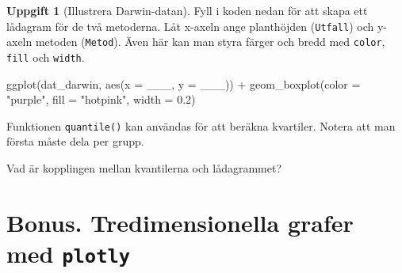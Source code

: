 \documentclass[
]{book}
\newenvironment{Shaded}{\begin{snugshade}}{\end{snugshade}}
\newcommand{\AttributeTok}[1]{\textcolor[rgb]{0.77,0.63,0.00}{#1}}
\newcommand{\FloatTok}[1]{\textcolor[rgb]{0.00,0.00,0.81}{#1}}
\newcommand{\FunctionTok}[1]{\textcolor[rgb]{0.00,0.00,0.00}{#1}}
\newcommand{\NormalTok}[1]{#1}
\newcommand{\OtherTok}[1]{\textcolor[rgb]{0.56,0.35,0.01}{#1}}
\newcommand{\SpecialCharTok}[1]{\textcolor[rgb]{0.00,0.00,0.00}{#1}}
\newcommand{\StringTok}[1]{\textcolor[rgb]{0.31,0.60,0.02}{#1}}
\theoremstyle{definition}
\theoremstyle{definition}
\theoremstyle{definition}
\newtheorem{exercise}{Uppgift}[chapter]
\theoremstyle{definition}
\theoremstyle{remark}
\begin{document}
\begin{exercise}[Illustrera Darwin-datan]
Fyll i koden nedan för att skapa ett lådagram för de två metoderna. Låt x-axeln ange planthöjden (\texttt{Utfall}) och y-axeln metoden (\texttt{Metod}). Även här kan man styra färger och bredd med \texttt{color}, \texttt{fill} och \texttt{width}.

\begin{Shaded}
\begin{Highlighting}[]
\FunctionTok{ggplot}\NormalTok{(dat\_darwin, }\FunctionTok{aes}\NormalTok{(}\AttributeTok{x =}\NormalTok{ \_\_\_, }\AttributeTok{y =}\NormalTok{ \_\_\_)) }\SpecialCharTok{+}
  \FunctionTok{geom\_boxplot}\NormalTok{(}\AttributeTok{color =} \StringTok{"purple"}\NormalTok{, }\AttributeTok{fill =} \StringTok{"hotpink"}\NormalTok{, }\AttributeTok{width =} \FloatTok{0.2}\NormalTok{)}
\end{Highlighting}
\end{Shaded}

Funktionen \texttt{quantile()} kan användas för att beräkna kvartiler. Notera att man första måste dela per grupp.

\begin{Shaded}
\end{Shaded}

Vad är kopplingen mellan kvantilerna och lådagrammet?
\end{exercise}

\hypertarget{bonus.-tredimensionella-grafer-med-plotly}{%
\section{\texorpdfstring{Bonus. Tredimensionella grafer med \texttt{plotly}}{Bonus. Tredimensionella grafer med plotly}}\label{bonus.-tredimensionella-grafer-med-plotly}}
\end{document}
